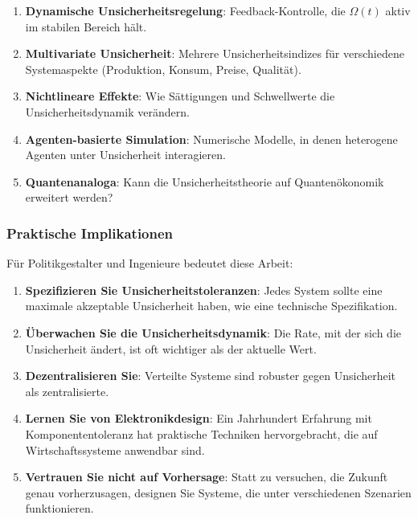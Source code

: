 \documentclass[a4paper, 12pt, twoside, openright]{report}
\theoremstyle{definition}
\theoremstyle{definition}
\begin{document}
\begin{enumerate}
    \item \textbf{Dynamische Unsicherheitsregelung}: Feedback-Kontrolle, die $\Omega(t)$ aktiv im stabilen Bereich hält.
    
    \item \textbf{Multivariate Unsicherheit}: Mehrere Unsicherheitsindizes für verschiedene Systemaspekte (Produktion, Konsum, Preise, Qualität).
    
    \item \textbf{Nichtlineare Effekte}: Wie Sättigungen und Schwellwerte die Unsicherheitsdynamik verändern.
    
    \item \textbf{Agenten-basierte Simulation}: Numerische Modelle, in denen heterogene Agenten unter Unsicherheit interagieren.
    
    \item \textbf{Quantenanaloga}: Kann die Unsicherheitstheorie auf Quantenökonomik erweitert werden?
\end{enumerate}

\subsubsection{Praktische Implikationen}

Für Politikgestalter und Ingenieure bedeutet diese Arbeit:

\begin{enumerate}
    \item \textbf{Spezifizieren Sie Unsicherheitstoleranzen}: Jedes System sollte eine maximale akzeptable Unsicherheit haben, wie eine technische Spezifikation.
    
    \item \textbf{Überwachen Sie die Unsicherheitsdynamik}: Die Rate, mit der sich die Unsicherheit ändert, ist oft wichtiger als der aktuelle Wert.
    
    \item \textbf{Dezentralisieren Sie}: Verteilte Systeme sind robuster gegen Unsicherheit als zentralisierte.
    
    \item \textbf{Lernen Sie von Elektronikdesign}: Ein Jahrhundert Erfahrung mit Komponententoleranz hat praktische Techniken hervorgebracht, die auf Wirtschaftssysteme anwendbar sind.
    
    \item \textbf{Vertrauen Sie nicht auf Vorhersage}: Statt zu versuchen, die Zukunft genau vorherzusagen, designen Sie Systeme, die unter verschiedenen Szenarien funktionieren.
\end{enumerate}
\end{document}
